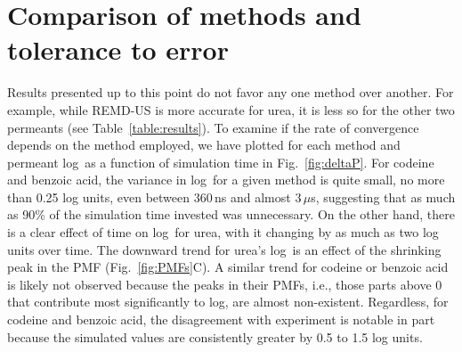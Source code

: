 %

\section{Comparison of methods and tolerance to error}
  \par Results presented up to this point do not favor any one method over another.  For example, while REMD-US is more accurate for urea, it is less so for the other two permeants (see Table~\ref{table:results}).  To examine if the rate of convergence depends on the method employed, we have plotted for each method and permeant log\perm~as a function of simulation time in Fig.~\ref{fig:deltaP}.  For codeine and benzoic acid, the variance in log\perm~for a given method is quite small, no more than 0.25 log units, even between 360\,ns and almost 3\,$\mu$s, suggesting that as much as 90\% of the simulation time invested was unnecessary.  On the other hand, there is a clear effect of time on log\perm~for urea, with it changing by as much as two log units over time.   The downward trend for urea's log\perm~is an effect of the shrinking peak in the PMF (Fig.~\ref{fig:PMFs}C).   A similar trend for codeine or benzoic acid is likely not observed because the peaks in their PMFs, i.e., those parts above 0 that contribute most significantly to log\perm, are almost non-existent.   Regardless, for codeine and benzoic acid, the disagreement with experiment is notable in part because the simulated values are consistently greater by 0.5 to 1.5 log units.



